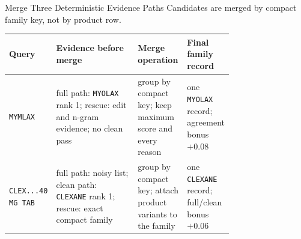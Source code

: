 \documentclass[aspectratio=169,10pt]{beamer}
\newcommand{\code}[1]{\texttt{#1}}
\begin{document}
\begin{frame}{Merge Three Deterministic Evidence Paths}
\scriptsize
Candidates are merged by compact family key, not by product row.

\begin{center}
\end{center}

\begin{table}
\centering
\scriptsize
\begin{tabularx}{\linewidth}{@{}L{0.14\linewidth}L{0.38\linewidth}L{0.22\linewidth}Y@{}}
\toprule
\textbf{Query} & \textbf{Evidence before merge} & \textbf{Merge operation} & \textbf{Final family record} \\
\midrule
\code{MYMLAX} & full path: \code{MYOLAX} rank 1; rescue: edit and n-gram evidence; no clean pass & group by compact key; keep maximum score and every reason & one \code{MYOLAX} record; agreement bonus $+0.08$ \\
\code{CLEX...40 MG TAB} & full path: noisy list; clean path: \code{CLEXANE} rank 1; rescue: exact compact family & group by compact key; attach product variants to the family & one \code{CLEXANE} record; full/clean bonus $+0.06$ \\
\bottomrule
\end{tabularx}
\end{table}
\end{frame}
\end{document}
